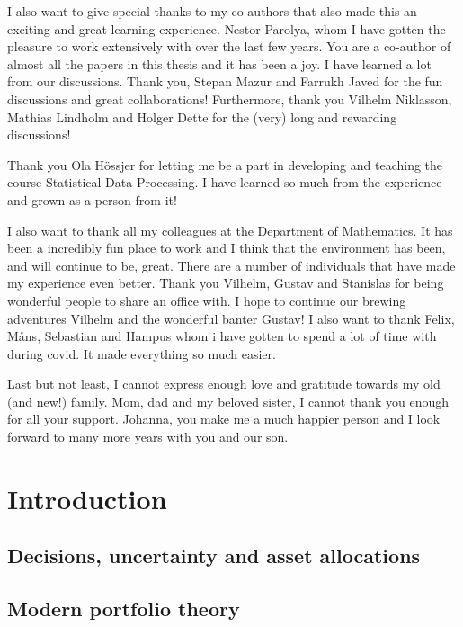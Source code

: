 \documentclass[12pt, oneside]{book}\usepackage{knitr}
\begin{document}
{I also want to give special thanks to my co-authors that also made this an exciting and great learning experience.
Nestor Parolya, whom I have gotten the pleasure to work extensively with over the last few years. 
You are a co-author of almost all the papers in this thesis and it has been a joy.
I have learned a lot from our discussions.
Thank you, Stepan Mazur and Farrukh Javed for the fun discussions and great collaborations!
Furthermore, thank you Vilhelm Niklasson, Mathias Lindholm and Holger Dette for the (very) long and rewarding discussions! 

Thank you Ola Hössjer for letting me be a part in developing and teaching the course Statistical Data Processing.
I have learned so much from the experience and grown as a person from it!

I also want to thank all my colleagues at the Department of Mathematics.
It has been a incredibly fun place to work and I think that the environment has been, and will continue to be, great.
There are a number of individuals that have made my experience even better.
Thank you Vilhelm, Gustav and Stanislas for being wonderful people to share an office with.
I hope to continue our brewing adventures Vilhelm and the wonderful banter Gustav!
I also want to thank Felix, Måns, Sebastian and Hampus whom i have gotten to spend a lot of time with during covid. 
It made everything so much easier.

Last but not least, I cannot express enough love and gratitude towards my old (and new!) family. 
Mom, dad and my beloved sister, I cannot thank you enough for all your support.
Johanna, you make me a much happier person and I look forward to many more years with you and our son. 
\newpage

\tableofcontents

\part{Introduction}
\chapter{Decisions, uncertainty and asset allocations}\label{ch:intro}

\chapter{Modern portfolio theory}\label{ch:MPT}


}
\end{document}
